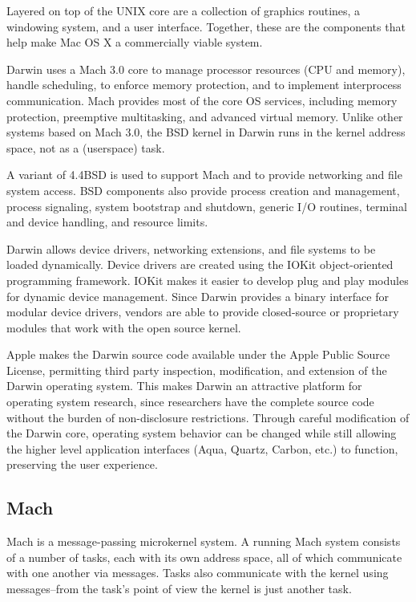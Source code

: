 Layered on top of the UNIX core are a collection of graphics routines,
a windowing system, and a user interface.  Together, these are the
components that help make Mac OS X a commercially viable system.

Darwin uses a Mach 3.0 core to manage processor resources (CPU and
memory), handle scheduling, to enforce memory protection, and to
implement interprocess communication.  Mach provides most of the
core OS services, including memory protection, preemptive multitasking,
and advanced virtual memory.  Unlike other systems based on Mach
3.0, the BSD kernel in Darwin runs in the kernel address space, not
as a (userspace) task.

A variant of 4.4BSD is used to support Mach and to provide networking
and file system access.  BSD components also provide process creation
and management, process signaling, system bootstrap and shutdown,
generic I/O routines, terminal and device handling, and resource
limits.

Darwin allows device drivers, networking extensions, and file systems
to be loaded dynamically.  Device drivers are created using the
IOKit object-oriented programming framework.  IOKit makes it easier
to develop plug and play modules for dynamic device management.
Since Darwin provides a binary interface for modular device drivers,
vendors are able to provide closed-source or proprietary modules
that work with the open source kernel.

Apple makes the Darwin source code available under the Apple Public
Source License, permitting third party inspection, modification,
and extension of the Darwin operating system.  This makes Darwin
an attractive platform for operating system research, since researchers
have the complete source code without the burden of non-disclosure
restrictions.  Through careful modification of the Darwin core,
operating system behavior can be changed while still allowing the
higher level application interfaces (Aqua, Quartz, Carbon, etc.)
to function, preserving the user experience.

\subsection{Mach}

Mach is a message-passing microkernel system. A running Mach system
consists of a number of tasks, each with its own address space, all
of which communicate with one another via messages. Tasks also
communicate with the kernel using messages--from the task's point
of view the kernel is just another task.

